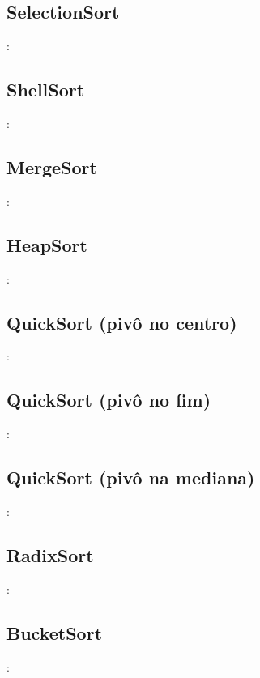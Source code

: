 \documentclass[a4paper, 12pt]{article} %
\begin{document}
\subsection{SelectionSort}:


\subsection{ShellSort}:


\subsection{MergeSort}:


\subsection{HeapSort}:


\subsection{QuickSort (pivô no centro)}:


\subsection{QuickSort (pivô no fim)}:


\subsection{QuickSort (pivô na mediana)}:


\subsection{RadixSort}:


\subsection{BucketSort}:

\end{document}

